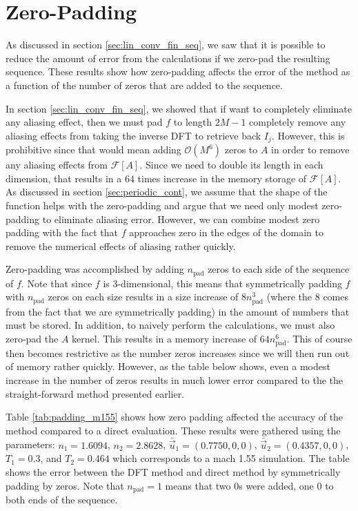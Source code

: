 \documentclass[12pt]{CSUNthesis}
\def\calF{\mathcal{F}}
\begin{document}
\section{Zero-Padding}

As discussed in section \ref{sec:lin_conv_fin_seq}, we saw that it is possible to reduce the amount of error from the calculations if we zero-pad the resulting sequence. These results show how zero-padding affects the error of the method as a function of the number of zeros that are added to the sequence. 

In section \ref{sec:lin_conv_fin_seq}, we showed that if want to completely eliminate any aliasing effect, then we must pad $f$ to length $2M - 1$ completely remove any aliasing effects from taking the inverse DFT to retrieve back $I_j$. However, this is prohibitive since that would mean adding $\mathcal{O}(M^6)$ zeros to $A$ in order to remove any aliasing effects from $\calF[A]$. Since we need to double its length in each dimension, that results in a 64 times increase in the memory storage of $\calF[A]$. 
As discussed in section \ref{sec:periodic_cont}, we assume that the shape of the function helps with the zero-padding and argue that we need only modest zero-padding to eliminate aliasing error.
However, we can combine modest zero padding with the fact that $f$ approaches zero in the edges of the domain to remove the numerical effects of aliasing rather quickly.

Zero-padding was accomplished by adding $n_{\text{pad}}$ zeros to each side of the sequence of $f$. Note that since $f$ is 3-dimensional, this means that symmetrically padding $f$ with $n_{\text{pad}}$ zeros on each size results in a size increase of $8n_{\text{pad}}^3$ (where the 8 comes from the fact that we are symmetrically padding) in the amount of numbers that must be stored. In addition, to naively perform the calculations, we must also zero-pad the $A$ kernel. This results in a memory increase of $64n_{\text{pad}}^6$. This of course then becomes restrictive as the number zeros increases since we will then run out of memory rather quickly. However, as the table below shows, even a modest increase in the number of zeros results in much lower error compared to the the straight-forward method presented earlier.

Table \ref{tab:padding_m155} shows how zero padding affected the accuracy of the method compared to a direct evaluation. These results were gathered using the parameters: $n_{1}=1.6094$, $n_{2}=2.8628$, $\bar{\vec{u}}_{1}=(0.7750,0,0)$, $\bar{\vec{u}}_{2}=(0.4357,0,0)$, $T_{1}=0.3$, and $T_{2}=0.464$ which corresponds to a mach 1.55 simulation. The table shows the error between the DFT method and direct method by symmetrically padding by zeros. Note that $n_{\text{pad}} = 1$ means that two 0s were added, one 0 to both ends of the sequence.
\end{document}
